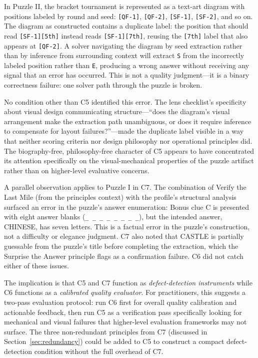 In Puzzle II, the bracket tournament is represented as a text-art diagram with positions labeled by round and seed: \texttt{[QF-1]}, \texttt{[QF-2]}, \texttt{[SF-1]}, \texttt{[SF-2]}, and so on. The diagram as constructed contains a duplicate label: the position that should read \texttt{[SF-1][5th]} instead reads \texttt{[SF-1][7th]}, reusing the \texttt{[7th]} label that also appears at \texttt{[QF-2]}. A solver navigating the diagram by seed extraction rather than by inference from surrounding context will extract \texttt{S} from the incorrectly labeled position rather than \texttt{E}, producing a wrong answer without receiving any signal that an error has occurred. This is not a quality judgment---it is a binary correctness failure: one solver path through the puzzle is broken.

No condition other than C5 identified this error. The lens checklist's specificity about visual design communicating structure---``does the diagram's visual arrangement make the extraction path unambiguous, or does it require inference to compensate for layout failures?''---made the duplicate label visible in a way that neither scoring criteria nor design philosophy nor operational principles did. The biography-free, philosophy-free character of C5 appears to have concentrated its attention specifically on the visual-mechanical properties of the puzzle artifact rather than on higher-level evaluative concerns.

A parallel observation applies to Puzzle I in C7. The combination of Verify the Last Mile (from the principles context) with the profile's structural analysis surfaced an error in the puzzle's answer enumeration: Bonus clue C is presented with eight answer blanks (\texttt{\_ \_ \_ \_ \_ \_ \_ \_}), but the intended answer, CHINESE, has seven letters. This is a factual error in the puzzle's construction, not a difficulty or elegance judgment. C7 also noted that CASTLE is partially guessable from the puzzle's title before completing the extraction, which the Surprise the Answer principle flags as a confirmation failure. C6 did not catch either of these issues.

The implication is that C5 and C7 function as \emph{defect-detection instruments} while C6 functions as a \emph{calibrated quality evaluator}. For practitioners, this suggests a two-pass evaluation protocol: run C6 first for overall quality calibration and actionable feedback, then run C5 as a verification pass specifically looking for mechanical and visual failures that higher-level evaluation frameworks may not surface. The three non-redundant principles from C7 (discussed in Section~\ref{sec:redundancy}) could be added to C5 to construct a compact defect-detection condition without the full overhead of C7.

